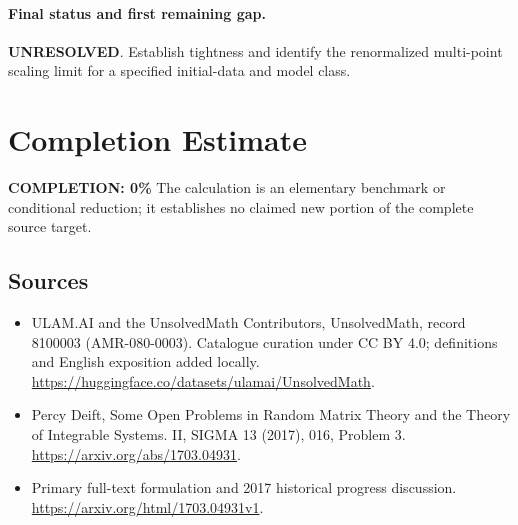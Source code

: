 \documentclass[11pt]{article}
\begin{document}
\paragraph{Final status and first remaining gap.}
\textbf{UNRESOLVED}. Establish tightness and identify the renormalized multi-point scaling limit for a specified initial-data and model class.

\section{Completion Estimate}
\noindent\textbf{COMPLETION: 0\%}
The calculation is an elementary benchmark or conditional reduction; it establishes no claimed new portion of the complete source target.

\subsection{Sources}
\begin{itemize}
\item[\hypertarget{source:8100003:1}{S1}] ULAM.AI and the UnsolvedMath Contributors, UnsolvedMath, record 8100003 (AMR-080-0003). Catalogue curation under CC BY 4.0; definitions and English exposition added locally.
\url{https://huggingface.co/datasets/ulamai/UnsolvedMath}.
\item[\hypertarget{source:8100003:2}{S2}] Percy Deift, Some Open Problems in Random Matrix Theory and the Theory of Integrable Systems. II, SIGMA 13 (2017), 016, Problem 3.
\url{https://arxiv.org/abs/1703.04931}.
\item[\hypertarget{source:8100003:3}{S3}] Primary full-text formulation and 2017 historical progress discussion.
\url{https://arxiv.org/html/1703.04931v1}.
\end{itemize}
\label{end:8100003}
\end{document}

